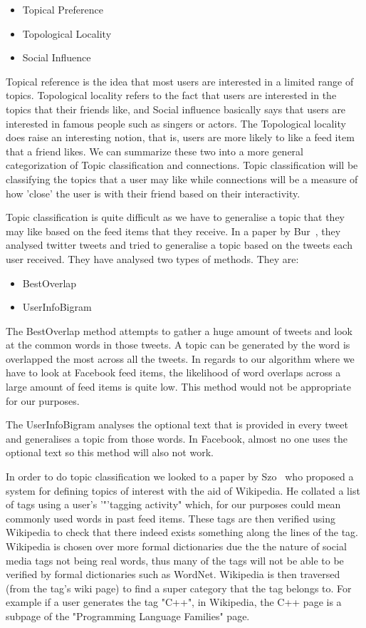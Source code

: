 \begin{itemize}
\item Topical Preference
\item Topological Locality
\item Social Influence
\end{itemize}

Topical reference is the idea that most users are interested in a limited range of topics. Topological locality refers to the fact that users are interested in the topics that their friends like, and Social influence basically says that users are interested in famous people such as singers or actors. The Topological locality does raise an interesting notion, that is, users are more likely to like a feed item that a friend likes. We can summarize these two into a more general categorization of Topic classification and connections. Topic classification will be classifying the topics that a user may like while connections will be a measure of how 'close' the user is with their friend based on their interactivity.

Topic classification is quite difficult as we have to generalise a topic that they may like based on the feed items that they receive. In a paper by Bur~\cite{Bur2013}, they analysed twitter tweets and tried to generalise a topic based on the tweets each user received. They have analysed two types of methods. They are:
\begin{itemize}
\item BestOverlap
\item UserInfoBigram
\end{itemize}

The BestOverlap method attempts to gather a huge amount of tweets and look at the common words in those tweets. A topic can be generated by the word is overlapped the most across all the tweets. In regards to our algorithm where we have to look at Facebook feed items, the likelihood of word overlaps across a large amount of feed items is quite low. This method would not be appropriate for our purposes.

The UserInfoBigram analyses the optional text that is provided in every tweet and generalises a topic from those words. In Facebook, almost no one uses the optional text so this method will also not work.

In order to do topic classification we looked to a paper by Szo~\cite{szomszor2008semantic} who proposed a system for defining topics of interest with the aid of Wikipedia. He collated a list of tags using a user's '"'tagging activity" which, for our purposes could mean commonly used words in past feed items. These tags are then verified using Wikipedia to check that there indeed exists something along the lines of the tag. Wikipedia is chosen over more formal dictionaries due the the nature of social media tags not being real words, thus many of the tags will not be able to be verified by formal dictionaries such as WordNet. Wikipedia is then traversed (from the tag's wiki page) to find a super category that the tag belongs to. For example if a user generates the tag "C++", in Wikipedia, the C++ page is a subpage of the "Programming Language Families" page.

